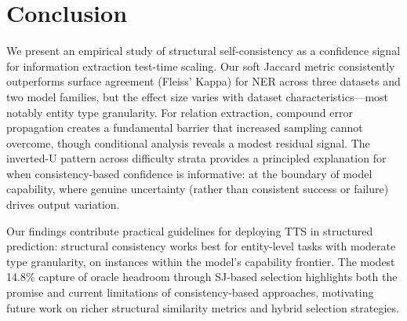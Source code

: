 \documentclass[11pt]{article}
\begin{document}
\section{Conclusion}

We present an empirical study of structural self-consistency as a confidence signal for information extraction test-time scaling.
Our soft Jaccard metric consistently outperforms surface agreement (Fleiss' Kappa) for NER across three datasets and two model families, but the effect size varies with dataset characteristics---most notably entity type granularity.
For relation extraction, compound error propagation creates a fundamental barrier that increased sampling cannot overcome, though conditional analysis reveals a modest residual signal.
The inverted-U pattern across difficulty strata provides a principled explanation for when consistency-based confidence is informative: at the boundary of model capability, where genuine uncertainty (rather than consistent success or failure) drives output variation.

Our findings contribute practical guidelines for deploying TTS in structured prediction: structural consistency works best for entity-level tasks with moderate type granularity, on instances within the model's capability frontier.
The modest 14.8\% capture of oracle headroom through SJ-based selection highlights both the promise and current limitations of consistency-based approaches, motivating future work on richer structural similarity metrics and hybrid selection strategies.


\end{document}
